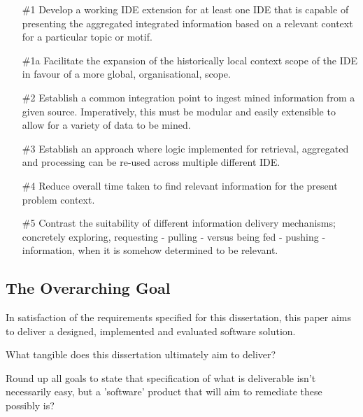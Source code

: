 \begin{enumerate}
	\item[\#1] Develop a working IDE extension for at least one IDE that is capable of presenting the aggregated integrated information based on a relevant context for a particular topic or motif. 
	
	\item[\#1a] Facilitate the expansion of the historically local context scope of the IDE in favour of a more global, organisational, scope.
	
	\item[\#2] Establish a common integration point to ingest mined information from a given source. Imperatively, this must be modular and easily extensible to allow for a variety of data to be mined.
	
	\item[\#3] Establish an approach where logic implemented for retrieval, aggregated and processing can be re-used across multiple different IDE.
	
	\item[\#4] Reduce overall time taken to find relevant information for the present problem context.
	
	\item[\#5] Contrast the suitability of different information delivery mechanisms; concretely exploring, requesting - pulling - versus being fed - pushing - information, when it is somehow determined to be relevant. 
	
\end{enumerate}

\subsection{The Overarching Goal}

In satisfaction of the requirements specified for this dissertation, this paper aims to deliver a designed, implemented and evaluated software solution.

What tangible does this dissertation ultimately aim to deliver?

Round up all goals to state that specification of what is deliverable isn't necessarily easy, but a 'software' product that will aim to remediate these possibly is?